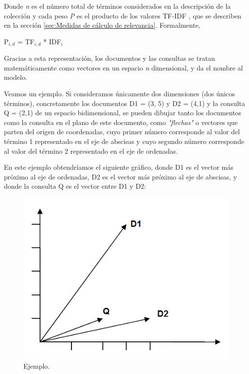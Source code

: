 \documentclass{article}
\begin{document}
Donde \textit{n} es el número total de términos considerados en la descripción de la colección y cada peso \textit{P} es el producto de los valores TF-IDF \label{TF-IDF}, que se describen en la sección \ref{sec:Medidas de cálculo de relevancia}. Formalmente,

\begin{center}
	P$_{i, d}$ = TF$_{i, d}$ * IDF$_{i}$
\end{center}

Gracias a esta representación, los documentos y las consultas se tratan matemáticamente como vectores en un espacio \textit{n} dimensional, y da el nombre al modelo. 

Veamos un ejemplo. Si consideramos únicamente dos dimensiones (dos únicos términos), concretamente los documentos D1 = (3, 5) y D2 = (4,1) y la consulta Q = (2,1) de un espacio bidimensional, se pueden dibujar tanto los documentos como la consulta en el plano de este documento, como \textit{"flechas"} o vectores que parten del origen de coordenadas, cuyo primer número corresponde al valor del término 1 representado en el eje de abscisas y cuyo segundo número corresponde al valor del término 2 representado en el eje de ordenadas. 

En este ejemplo obtendríamos el siguiente gráfico, donde D1 es el vector más próximo al eje de ordenadas, D2 es el vector más próximo al eje de abscisas, y donde la consulta Q es el vector entre D1 y D2:

\begin{figure}[h]
	\begin{center}
		\includegraphics*[scale=0.5]{grafica.png}
	\end{center}
	\caption{Ejemplo.}
	\label{fig: Figure 7}
\end{figure}
\end{document}

